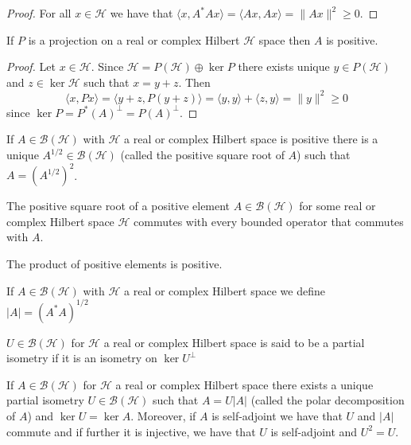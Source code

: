 \begin{proof}
For all $x\in\mathcal{H}$ we have that $\langle x,A^*Ax\rangle=\langle Ax,Ax \rangle = \|Ax\|^2\geq 0$.
\end{proof}

\begin{theorem}
If $P$ is a projection on a real or complex Hilbert $\mathcal{H}$ space then $A$ is positive.
\end{theorem}

\begin{proof}
Let $x\in\mathcal{H}$. Since $\mathcal{H}=P(\mathcal{H})\oplus\ker P$ there exists unique $y\in P(\mathcal{H})$ and $z\in\ker\mathcal{H}$ such that $x=y+z$. Then
\begin{equation}
\langle x,Px \rangle =\langle y+z,P(y+z)\rangle=\langle y,y \rangle +\langle z,y\rangle=\|y\|^2\geq 0
\end{equation}
since $\ker P=P^*(A)^\bot=P(A)^\bot$.
\end{proof}

\begin{theorem}
If $A\in\mathcal{B}(\mathcal{H})$ with $\mathcal{H}$ a real or complex Hilbert space is positive there is a unique $A^{1/2}\in\mathcal{B}(\mathcal{H})$ (called the positive square root of $A$) such that $A=(A^{1/2})^2$.
\end{theorem}

\begin{theorem}
The positive square root of a positive element $A\in\mathcal{B}(\mathcal{H})$ for some real or complex Hilbert space $\mathcal{H}$ commutes with every bounded operator that commutes with $A$.
\end{theorem}

\begin{theorem}
The product of positive elements is positive.
\end{theorem}

\begin{definition}
If $A\in\mathcal{B}(\mathcal{H})$ with $\mathcal{H}$ a real or complex Hilbert space we define $|A|=(A^*A)^{1/2}$
\end{definition}

\begin{definition}
$U\in\mathcal{B}(\mathcal{H})$ for $\mathcal{H}$ a real or complex Hilbert space is said to be a partial isometry if it is an isometry on $\ker U^\bot$
\end{definition}

\begin{theorem}
If $A\in\mathcal{B}(\mathcal{H})$ for $\mathcal{H}$ a real or complex Hilbert space there exists a unique partial isometry $U\in\mathcal{B}(\mathcal{H})$ such that $A=U|A|$ (called the polar decomposition of $A$) and $\ker U = \ker A$. Moreover, if $A$ is self-adjoint we have that $U$ and $|A|$ commute and if further it is injective, we have that $U$ is self-adjoint and $U^2=U$.
\end{theorem}

